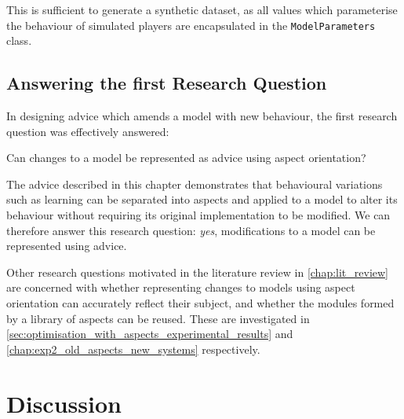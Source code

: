 This is sufficient to generate a synthetic dataset, as all values which
parameterise the behaviour of simulated players are encapsulated in the
\lstinline{ModelParameters} class. 





\subsection{Answering the first Research Question}
In designing advice which amends a model with new behaviour, the first research
question was effectively answered:

\begin{researchquestion}
  Can changes to a model be represented as advice using aspect orientation?
\end{researchquestion}

The advice described in this chapter demonstrates that behavioural variations
such as learning can be separated into aspects and applied to a model to alter
its behaviour without requiring its original implementation to be modified. We
can therefore answer this research question: \emph{yes}, modifications to a
model can be represented using advice.


Other research questions motivated in the literature review in
\cref{chap:lit_review} are concerned with whether representing changes to models
using aspect orientation can accurately reflect their subject, and whether the
modules formed by a library of aspects can be reused. These are investigated in
\cref{sec:optimisation_with_aspects_experimental_results} and
\cref{chap:exp2_old_aspects_new_systems} respectively.



\section{Discussion}
\label{sec:optimisation_with_aspects_discussion}

